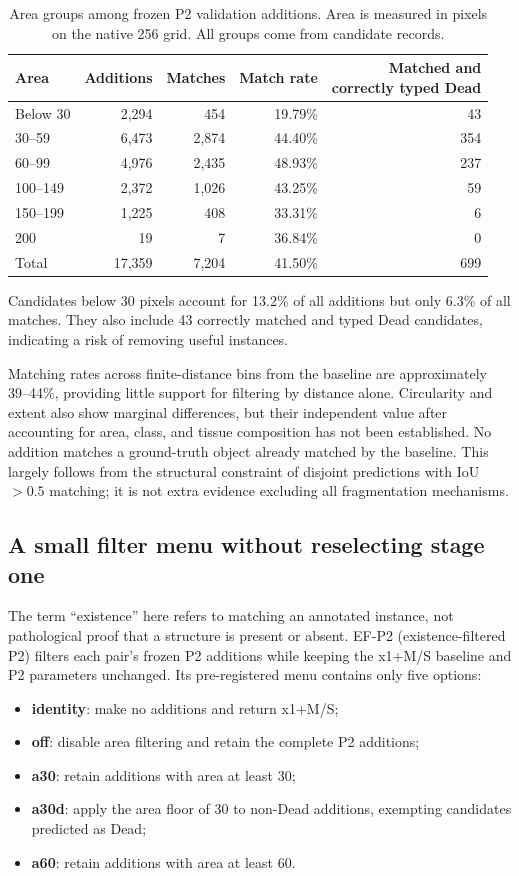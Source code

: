 \documentclass[11pt,a4paper]{article}
\begin{document}
\begin{table}[H]
\centering\small
\caption{Area groups among frozen P2 validation additions. Area is measured in pixels on the native 256 grid. All groups come from candidate records.}
\label{tab:area}
\begin{tabular}{lrrrr}\toprule
Area & Additions & Matches & Match rate & \shortstack{Matched and\\correctly typed Dead}\\\midrule
Below 30 & 2,294 & 454 & 19.79\% & 43\\
30--59 & 6,473 & 2,874 & 44.40\% & 354\\
60--99 & 4,976 & 2,435 & 48.93\% & 237\\
100--149 & 2,372 & 1,026 & 43.25\% & 59\\
150--199 & 1,225 & 408 & 33.31\% & 6\\
200 & 19 & 7 & 36.84\% & 0\\\midrule
Total & 17,359 & 7,204 & 41.50\% & 699\\\bottomrule
\end{tabular}
\end{table}

Candidates below 30 pixels account for 13.2\% of all additions but only 6.3\% of all matches. They also include 43 correctly matched and typed Dead candidates, indicating a risk of removing useful instances.

Matching rates across finite-distance bins from the baseline are approximately 39--44\%, providing little support for filtering by distance alone. Circularity and extent also show marginal differences, but their independent value after accounting for area, class, and tissue composition has not been established. No addition matches a ground-truth object already matched by the baseline. This largely follows from the structural constraint of disjoint predictions with IoU$>0.5$ matching; it is not extra evidence excluding all fragmentation mechanisms.

\subsection{A small filter menu without reselecting stage one}

The term ``existence'' here refers to matching an annotated instance, not pathological proof that a structure is present or absent. EF-P2 (existence-filtered P2) filters each pair's frozen P2 additions while keeping the x1+M/S baseline and P2 parameters unchanged. Its pre-registered menu contains only five options\cite{efplan}:
\begin{itemize}
\item \textbf{identity}: make no additions and return x1+M/S;
\item \textbf{off}: disable area filtering and retain the complete P2 additions;
\item \textbf{a30}: retain additions with area at least 30;
\item \textbf{a30d}: apply the area floor of 30 to non-Dead additions, exempting candidates predicted as Dead;
\item \textbf{a60}: retain additions with area at least 60.
\end{itemize}
\end{document}
